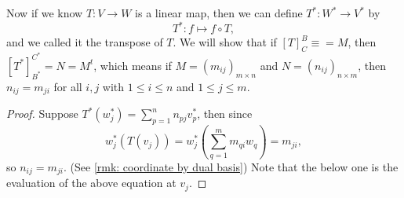 Now if we know \(T: V \to W\) is a linear map, then we can define \(T^*: W^* \to V^*\) by 
\[
    T^*: f \mapsto f \circ T,
\] and we called it the transpose of \(T\). We will show that if \([T]_C^B \equiv = M\), then \(\left[ T^* \right]^{C^*}_{B^*} = N = M^t\), which means if \(M = (m_{ij})_{m \times n}\) and \(N = (n_{ij})_{n \times m}\), then \(n_{ij} = m_{ji}\) for all \(i, j\) with \(1 \le i \le n\) and \(1 \le j \le m\). 
\begin{proof}
    Suppose \(T^* \left( w_j^* \right) = \sum_{p=1}^{n} n_{pj} v_p^*  \), then since
    \[
        w_j^* \left( T(v_j) \right) = w_j^* \left( \sum_{q=1}^{m} m_{qi} w_q  \right) = m_{ji},
    \] so \(n_{ij} = m_{ji}\). (See \autoref{rmk: coordinate by dual basis}) Note that the below one is the evaluation of the above equation at \(v_j\).  
\end{proof}         